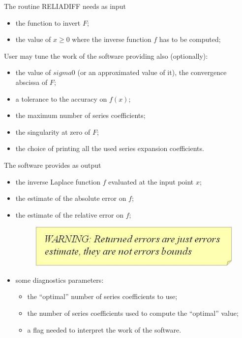 \documentclass[10pt]{article}
\begin{document}
The routine RELIADIFF needs as input
\begin{itemize}
\item
the function to invert $F$;
\item the value of $x\geq 0$ where the inverse function $f$ has to be computed;
\end{itemize}


User may tune the work of the software providing also (optionally):
\begin{itemize}
\item
the value of $sigma0$ (or an approximated value of it), the convergence abscissa of $F$;
\item a tolerance to the accuracy on $f(x)$;
\item the maximum number of series coefficients;
\item the singularity at zero of $F$;
\item the choice of printing all the used series expansion coefficients.
\end{itemize}


The software provides as output
\begin{itemize}
\item
the inverse Laplace function $f$ evaluated at the input point $x$;
\item the estimate of the absolute error on $f$;
\item the estimate of the relative error on $f$;

\begin{figure}[!h]
\begin{flushright}

\includegraphics[scale=0.8]{rel4}
\end{flushright}
\end{figure}

\item some diagnostics parameters:
\begin{itemize}
\item the ``optimal'' number of series coefficients to use;
\item the number of series coefficients used to compute the ``optimal'' value;
\item a flag needed to interpret the work of the software.
\end{itemize}\end{itemize}
\end{document}
